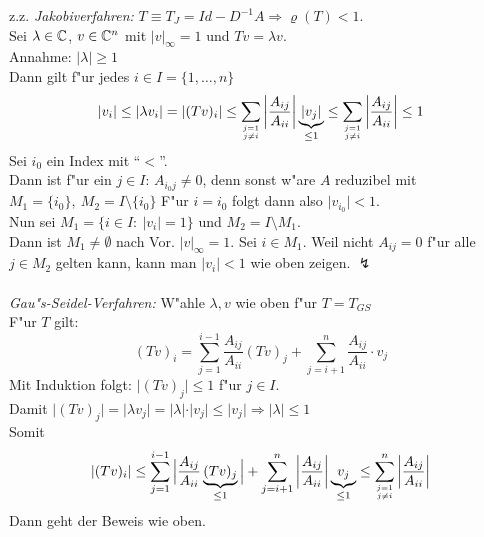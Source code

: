 \documentclass{scrartcl}
\begin{document}
\begin{Bew}
\begin{iaufz}
\setcounter{enumi}{1}
\item z.z. \emph{Jakobiverfahren:} $T \equiv T_J = Id - D^{-1} A \Rightarrow \varrho(T) < 1$. \\
Sei $\lambda \in \mathbb{C}$, $v \in \mathbb{C}^n$ mit $\vert v \vert_{\infty} = 1$ und $Tv = \lambda v$. \\
Annahme: $\vert \lambda \vert \geq 1$ \\
Dann gilt f"ur jedes $i \in I = \{ 1, \ldots, n \}$ 
$$\vert v_i \vert \leq \vert \lambda v_i \vert = \vert (Tv)_i \vert \leq \sum\limits_{\genfrac{}{}{0pt}{}{j=1}{j \neq i}} \left\vert \frac{A_{ij}}{A_{ii}} \right\vert \underbrace{ \vert v_j \vert }_{\leq 1} \leq \sum\limits_{\genfrac{}{}{0pt}{}{j=1}{j \neq i}} \left\vert \frac{A_{ij}}{A_{ii}} \right\vert \leq 1$$
Sei $i_0$ ein Index mit "`$<$"'. \\
Dann ist f"ur ein $j \in I$: $A_{i_0j} \neq 0$, denn sonst w"are $A$ reduzibel mit $M_1 = \{ i_0 \}, \ M_2 = I \setminus \{ i_0 \}$ 
F"ur $i=i_0$ folgt dann also $\vert v_{i_0} \vert < 1$.  \\
Nun sei $M_1 = \{ i \in I: \ \vert v_i \vert = 1 \}$ und $M_2 = I \setminus M_1$. \\
Dann ist $M_1 \neq \emptyset$ nach Vor. $\vert v \vert_\infty = 1$. Sei $i \in M_1$. Weil nicht $A_{ij} = 0$ f"ur alle $j \in M_2$ gelten kann, kann man $\vert v_i \vert < 1$ wie oben zeigen. $\lightning$
\\ \\
\emph{Gau"s-Seidel-Verfahren:} W"ahle $\lambda, v$ wie oben f"ur $T = T_{GS}$ \\
F"ur $T$ gilt: 
$$ (Tv)_i = \sum\limits_{j=1}^{i-1} \frac{A_{ij}}{A_{ii}} (Tv)_j + \sum\limits_{j=i+1}^n \frac{A_{ij}}{A_{ii}} \cdot v_j$$
Mit Induktion folgt: $\vert (Tv)_j \vert \leq 1$ f"ur $j \in I$. \\
Damit $\vert (Tv)_j \vert = \vert \lambda v_j \vert = \vert \lambda \vert \cdot \vert v_j \vert \leq \vert v_j \vert \Rightarrow \vert \lambda \vert \leq 1$ \\
Somit
$$\vert (Tv)_i \vert \leq \sum\limits_{j=1}^{i-1} \Big\vert \frac{A_{ij}}{A_{ii}} \underbrace{(Tv)_j}_{\leq 1} \Big\vert + \sum\limits_{j=i+1}^n \left\vert \frac{A_{ij}}{A_{ii}} \right\vert \underbrace{v_j}_{\leq 1} \leq \sum\limits_{\genfrac{}{}{0pt}{}{j=1}{j \neq i}}^n \left\vert \frac{A_{ij}}{A_{ii}} \right\vert$$
Dann geht der Beweis wie oben.
\end{iaufz}
\end{Bew}
\end{document}
